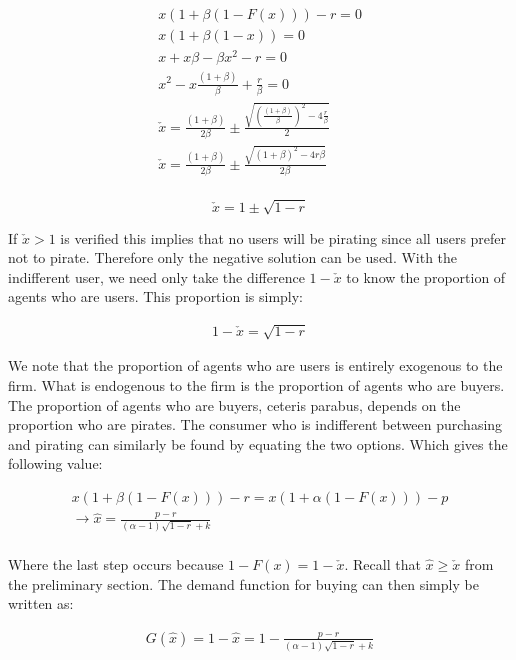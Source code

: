 \documentclass[11pt]{article}
\begin{document}
\begin{align*}
x(1+\beta(1-F(x)))-r=0 \\
x(1+\beta(1-x))=0 \\
x+x\beta-\beta x^2-r=0 \\
x^2-x\frac{(1+\beta)}{\beta} +\frac{r}{\beta} = 0 \\
\check{x} = \frac{(1+\beta)}{2 \beta}
\pm
\frac{ \sqrt{ \left(\frac{(1+\beta)}{\beta}\right)^2 -4\frac{r}{\beta} } }{2} \\
\check{x} = \frac{(1+\beta)}{2 \beta}
\pm
\frac{ \sqrt{ \left(1+\beta\right)^2 -4r\beta } }{2 \beta} \\
\end{align*}



\begin{equation*}
\check{x} = 1
\pm \sqrt{ 1 -r }
\end{equation*}

If $\check{x}>1$ is verified this implies that no users will be pirating since all users prefer not to pirate. Therefore only the negative solution can be used.  With the indifferent user, we need only take the difference $1-\check{x}$ to know the proportion of agents who are users. This proportion is simply:

\begin{align*}
1-\check{x}=\sqrt{ 1 -r }
\end{align*}

We note that the proportion of agents who are users is entirely exogenous to the firm. What is endogenous to the firm is the proportion of agents who are buyers. The proportion of agents who are buyers, ceteris parabus, depends on the proportion who are pirates. The consumer who is indifferent between purchasing and pirating can similarly be found by equating the two options. Which gives the following value:

\begin{align*}
x(1+\beta(1-F(x)))-r=x(1+\alpha(1-F(x)))-p \\
\rightarrow \hat{x}=\frac{p-r}{(\alpha-1)\sqrt{ 1 -r }+k} \\
\end{align*}

Where the last step occurs because $1-F(x)=1-\check{x}$. Recall that $\hat{x} \geq \check{x}$ from the preliminary section. The demand function for buying can then simply be written as:

\begin{align*}
G(\hat{x})=1-\hat{x} =1-\frac{p-r}{(\alpha-1)\sqrt{ 1 -r }+k}
\end{align*}
\end{document}
